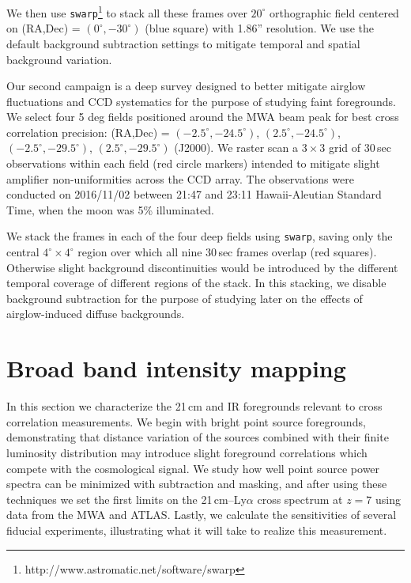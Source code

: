 \documentclass[preprint]{aastex}
\begin{document}
We then use {\tt swarp}\footnote{http://www.astromatic.net/software/swarp} \citep{swarp} to stack all these frames over $20^\circ$ orthographic field centered on (RA,Dec) = $(0^\circ,-30^\circ)$ (blue square) with 1.86'' resolution. We use the default background subtraction settings to mitigate temporal and spatial background variation. 


Our second campaign is a deep survey designed to better mitigate airglow fluctuations and CCD systematics for the purpose of studying faint foregrounds. We select four 5 deg fields positioned around the MWA beam peak for best cross correlation precision: (RA,Dec) = $(-2.5^\circ, -24.5^\circ)$, $(2.5^\circ, -24.5^\circ)$, $(-2.5^\circ, -29.5^\circ)$, $(2.5^\circ, -29.5^\circ)$ (J2000). We raster scan a $3\times3$ grid of 30\,sec observations within each field (red circle markers) intended to mitigate slight amplifier non-uniformities across the CCD array. The observations were conducted on 2016/11/02 between 21:47 and 23:11 Hawaii-Aleutian Standard Time, when the moon was 5\% illuminated.

We stack the frames in each of the four deep fields using {\tt swarp}, saving only the central $4^\circ\times 4^\circ$ region over which all nine 30\,sec frames overlap (red squares). Otherwise slight background discontinuities would be introduced by the different temporal coverage of different regions of the stack. In this stacking, we disable background subtraction for the purpose of studying later on the effects of airglow-induced diffuse backgrounds.

\section{Broad band intensity mapping}

In this section we characterize the 21\,cm and IR foregrounds relevant to cross correlation measurements. We begin with bright point source foregrounds, demonstrating that distance variation of the sources combined with their finite luminosity distribution may introduce slight foreground correlations which compete with the cosmological signal. We study how well point source power spectra can be minimized with subtraction and masking, and after using these techniques we set the first limits on the 21\,cm--Ly$\alpha$ cross spectrum at $z=7$ using data from the MWA and ATLAS. Lastly, we calculate the sensitivities of several fiducial experiments, illustrating what it will take to realize this measurement.
\end{document}
